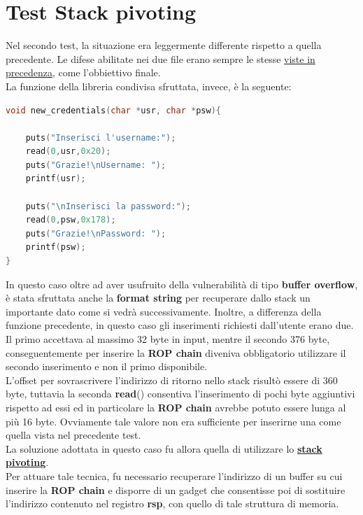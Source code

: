 \section{Test Stack pivoting}
\label{sec:Test_2}
Nel secondo test, la situazione era leggermente differente rispetto a quella precedente. Le difese abilitate nei due file erano sempre le stesse \hyperref[fig:checksec1]{viste in precedenza}, come l'obbiettivo finale.\\
La funzione della libreria condivisa sfruttata, invece, è la seguente:
\begin{lstlisting}[language=C, label=new credentials, caption={funzione \textbf{new\_credentials()} della libreria condivisa.}, style=C lang]
void new_credentials(char *usr, char *psw){
   
    puts("Inserisci l'username:");
    read(0,usr,0x20);
    puts("Grazie!\nUsername: ");
    printf(usr);

    puts("\nInserisci la password:");
    read(0,psw,0x178);
    puts("Grazie!\nPassword: ");
    printf(psw);
}
\end{lstlisting}
In questo caso oltre ad aver usufruito della vulnerabilità di tipo \textbf{buffer overflow}, è stata sfruttata anche la \textbf{format string} per recuperare dallo stack un importante dato come si vedrà successivamente.
Inoltre, a differenza della funzione precedente, in questo caso gli inserimenti richiesti dall'utente erano due. Il primo accettava al massimo 32 byte in input, mentre il secondo 376 byte, conseguentemente per inserire la \textbf{ROP chain} diveniva obbligatorio 
utilizzare il secondo inserimento e non il primo disponibile.\\
L'offset per sovrascrivere l'indirizzo di ritorno nello stack risultò essere di 360 byte, tuttavia la seconda \textbf{read}() consentiva l'inserimento di pochi byte aggiuntivi rispetto ad essi ed in particolare la \textbf{ROP chain} avrebbe potuto essere lunga al più 16 byte. Ovviamente 
tale valore non era sufficiente per inserirne una come quella vista nel precedente test.\\
La soluzione adottata in questo caso fu allora quella di utilizzare lo \hyperref[sec:Attack_2]{\textbf{stack pivoting}}.\\ 
Per attuare tale tecnica, fu necessario recuperare l'indirizzo di un buffer su cui inserire la \textbf{ROP chain} e disporre di un gadget che consentisse poi di sostituire l'indirizzo contenuto nel registro \textbf{rsp}, con quello di tale struttura di memoria.\\
